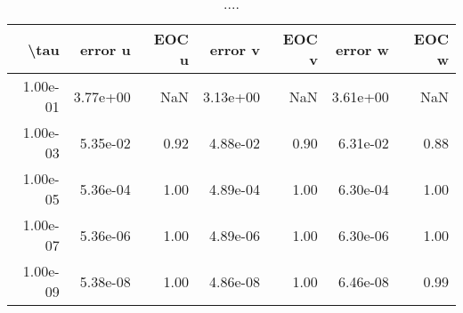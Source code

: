 \begin{table}[ht]
\centering
\begin{tabular}{rrrrrrr}
  \hline
  \textbf{\textbackslash{}tau} & \textbf{error u} & \textbf{EOC u} & \textbf{error v} & \textbf{EOC v} & \textbf{error w} & \textbf{EOC w} \\\hline
  1.00e-01 & 3.77e+00 & NaN & 3.13e+00 & NaN & 3.61e+00 & NaN \\
  1.00e-03 & 5.35e-02 & 0.92 & 4.88e-02 & 0.90 & 6.31e-02 & 0.88 \\
  1.00e-05 & 5.36e-04 & 1.00 & 4.89e-04 & 1.00 & 6.30e-04 & 1.00 \\
  1.00e-07 & 5.36e-06 & 1.00 & 4.89e-06 & 1.00 & 6.30e-06 & 1.00 \\
  1.00e-09 & 5.38e-08 & 1.00 & 4.86e-08 & 1.00 & 6.46e-08 & 0.99 \\\hline
\end{tabular}
\caption{....}
\end{table}
